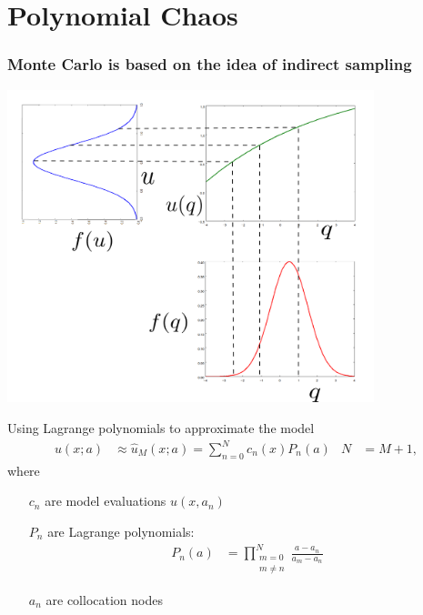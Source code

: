 \documentclass{beamer}
\begin{document}
\section{Polynomial Chaos}

\begin{frame}
  \frametitle{Monte Carlo is based on the idea of indirect sampling}
  \begin{center}
   \includegraphics[width=0.8\textwidth]{mapping.png}
  \end{center}
\end{frame}

\begin{frame}[fragile]{Using Lagrange polynomials to approximate the model}{}
    \begin{align*}
        u(x;a) &\approx \hat u_M(x;a) =
        \sum_{n=0}^N c_n(x) P_n(a) & N&=M+1,
    \end{align*}
    where
    \begin{itemize}
        \item[$c_n$] are model evaluations $u(x, a_n)$
        \item[$P_n$] are Lagrange polynomials:
            \begin{align*}
                P_n(a) &= \prod_{\substack{m=0 \\ m\neq n}}^N \frac{a-a_n}{a_m-a_n}
            \end{align*}
        \item[$a_n$] are collocation nodes
    \end{itemize}
\end{frame}
\end{document}
